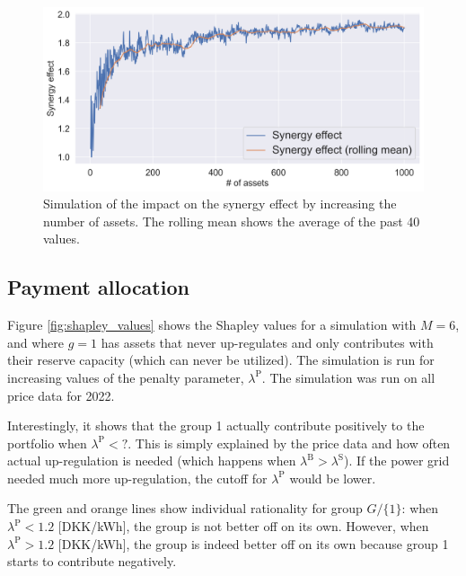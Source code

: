 \documentclass[lettersize,journal]{IEEEtran}
\begin{document}
\begin{figure}[!t]
    \centering
    \includegraphics[width=\columnwidth]{figures/synergy_effect.png}
    \caption{Simulation of the impact on the synergy effect by increasing the number of assets. The rolling mean shows the average of the past 40 values.}
    \label{fig:synergy_effect}
\end{figure}

\subsection{Payment allocation}

Figure \ref{fig:shapley_values} shows the Shapley values for a simulation with $M = 6$, and where $g = 1$ has assets that never up-regulates and only contributes with their reserve capacity (which can never be utilized). The simulation is run for increasing values of the penalty parameter, $\lambda^{\text{P}}$. The simulation was run on all price data for 2022.

Interestingly, it shows that the group 1 actually contribute positively to the portfolio when $\lambda^{\text{P}} < ?$. This is simply explained by the price data and how often actual up-regulation is needed (which happens when $\lambda^{\text{B}} > \lambda^{\text{S}}$). If the power grid needed much more up-regulation, the cutoff for $\lambda^{\text{P}}$ would be lower.

The green and orange lines show individual rationality for group $G / \{1\}$: when $\lambda^{\text{P}} < 1.2$ [DKK/kWh], the group is not better off on its own. However, when $\lambda^{\text{P}} > 1.2$ [DKK/kWh], the group is indeed better off on its own because group 1 starts to contribute negatively.
\end{document}
